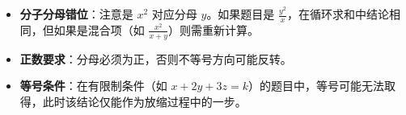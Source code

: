 \begin{trapbox}
\begin{itemize}
    \item \textbf{分子分母错位}：注意是 $x^2$ 对应分母 $y$。如果题目是 $\frac{y^2}{x}$，在循环求和中结论相同，但如果是混合项（如 $\frac{x^2}{x+y}$）则需重新计算。
    \item \textbf{正数要求}：分母必须为正，否则不等号方向可能反转。
    \item \textbf{等号条件}：在有限制条件（如 $x+2y+3z=k$）的题目中，等号可能无法取得，此时该结论仅能作为放缩过程中的一步。
\end{itemize}
\end{trapbox}